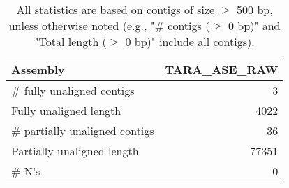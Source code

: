 \documentclass[12pt,a4paper]{article}
\begin{document}
\begin{table}[ht]
\begin{center}
\caption{All statistics are based on contigs of size $\geq$ 500 bp, unless otherwise noted (e.g., "\# contigs ($\geq$ 0 bp)" and "Total length ($\geq$ 0 bp)" include all contigs).}
\begin{tabular}{|l*{1}{|r}|}
\hline
Assembly & TARA\_ASE\_RAW \\ \hline
\# fully unaligned contigs & 3 \\ \hline
Fully unaligned length & 4022 \\ \hline
\# partially unaligned contigs & 36 \\ \hline
Partially unaligned length & 77351 \\ \hline
\# N's & 0 \\ \hline
\end{tabular}
\end{center}
\end{table}
\end{document}
